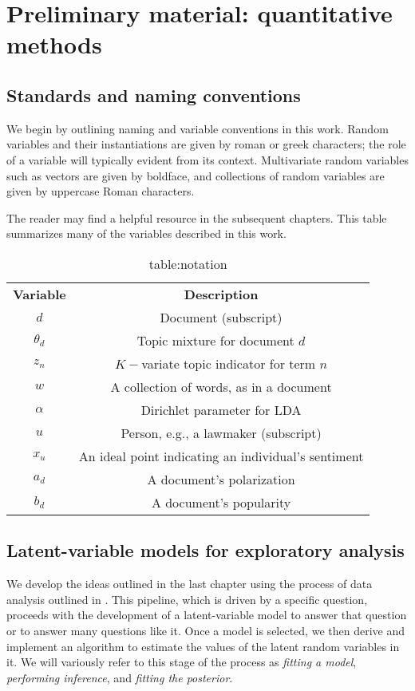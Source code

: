 \chapter{Preliminary material: quantitative methods}


\section{Standards and naming conventions}
  We begin by outlining naming and variable conventions in this work.
  Random variables and their instantiations are given by roman or
  greek characters; the role of a variable will typically evident from
  its context.  Multivariate random variables such as vectors are
  given by boldface, and collections of random variables are given by
  uppercase Roman characters.

  The reader may find  a helpful resource in the subsequent chapters.  This table summarizes many of the variables described in this work.
  \begin{table}
    \caption{table:notation}
    \begin{tabular}{|c|c|}
      \textbf{Variable} & \textbf{Description} \\
      $d$ & Document (subscript) \\
      $\theta_d$ & Topic mixture for document $d$ \\
      $z_n$ & $K-$variate topic indicator for term $n$ \\
      $w$ & A collection of words, as in a document \\
      $\alpha$ & Dirichlet parameter for LDA \\
      $u$ & Person, e.g., a lawmaker (subscript) \\
      $x_u$ & An ideal point indicating an individual's sentiment \\
      $a_d$ & A document's polarization \\
      $b_d$ & A document's popularity \\
    \end{tabular}
  \end{table}

\section{Latent-variable models for exploratory analysis}
  We develop the ideas outlined in the last chapter using the process
  of data analysis outlined in .  This
  pipeline, which is driven by a specific question, proceeds with the
  development of a latent-variable model to answer that question or to
  answer many questions like it.  Once a model is selected, we then
  derive and implement an algorithm to estimate the values of the
  latent random variables in it.  We will variously refer to this
  stage of the process as \emph{fitting a model}, \emph{performing
    inference}, and \emph{fitting the posterior}.

